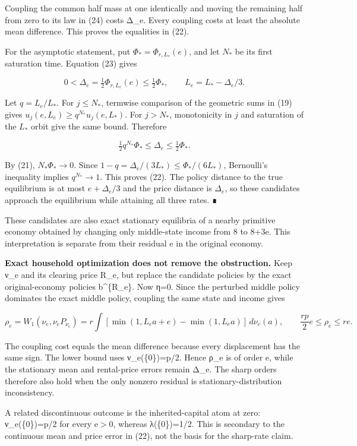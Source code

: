 \documentclass{article}
\begin{document}
Coupling the common half mass at one identically and moving the remaining half from zero to its law in (24) costs Δ\_e. Every coupling costs at least the absolute mean difference. This proves the equalities in (22).

For the asymptotic statement, put \(\Phi_*=\Phi_{r,L_*}(e)\), and let \(N_*\) be its first saturation time. Equation (23) gives

\[
0<\Delta_e=\tfrac12\Phi_{r,L_e}(e)\le\tfrac12\Phi_*,
\qquad L_e=L_*-\Delta_e/3.
\]

Let \(q=L_e/L_*\). For \(j\le N_*\), termwise comparison of the geometric sums in (19) gives \(u_j(e,L_e)\ge q^{N_*}u_j(e,L_*)\). For \(j>N_*\), monotonicity in \(j\) and saturation of the \(L_*\) orbit give the same bound. Therefore

\[
\tfrac12 q^{N_*}\Phi_*\le\Delta_e\le\tfrac12\Phi_*.
\]

By (21), \(N_*\Phi_*\to0\). Since \(1-q=\Delta_e/(3L_*)\le\Phi_*/(6L_*)\), Bernoulli's inequality implies \(q^{N_*}\to1\). This proves (22). The policy distance to the true equilibrium is at most \(e+\Delta_e/3\) and the price distance is \(\Delta_e\), so these candidates approach the equilibrium while attaining all three rates. ∎

These candidates are also exact stationary equilibria of a nearby primitive economy obtained by changing only middle-state income from 8 to 8+3e. This interpretation is separate from their residual e in the original economy.

\textbf{Exact household optimization does not remove the obstruction.} Keep ν\_e and its clearing price R\_e, but replace the candidate policies by the exact original-economy policies b\^{}\{R\_e\}. Now η=0. Since the perturbed middle policy dominates the exact middle policy, coupling the same state and income gives

\[
\rho_e=W_1(\nu_e,\nu_e P_{\nu_e})
=r\int\left[\min(1,L_ea+e)-\min(1,L_ea)\right]\,d\nu_e(a),
\qquad
\frac{rp}{2}e\le\rho_e\le re.
\]

The coupling cost equals the mean difference because every displacement has the same sign. The lower bound uses ν\_e(\{0\})=p/2. Hence ρ\_e is of order e, while the stationary mean and rental-price errors remain Δ\_e. The sharp orders therefore also hold when the only nonzero residual is stationary-distribution inconsistency.

A related discontinuous outcome is the inherited-capital atom at zero: ν\_e(\{0\})=p/2 for every e\(\gt\)0, whereas λ(\{0\})=1/2. This is secondary to the continuous mean and price error in (22), not the basis for the sharp-rate claim.
\end{document}
